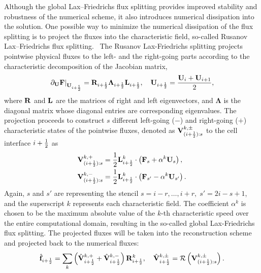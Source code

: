 Although the global Lax–Friedrichs flux splitting provides improved stability and robustness
of the numerical scheme, it also introduces numerical dissipation into the solution.
One possible way to minimize the numerical dissipation of the flux splitting is to project
the fluxes into the characteristic field, so-called Rusanov Lax–Friedrichs flux splitting.~\cite{vcrnjaric2006different,mignone2010high}
The Rusanov Lax-Friedrichs splitting projects pointwise physical fluxes
to the left- and the right-going parts according to the characteristic decomposition of the Jacobian matrix,
\begin{equation}\label{eq:jacobian_iph}
    \left. \partial_{\mathbf{U}} \mathbf{F}\right|_{\mathbf{U}_{{i+\frac{1}{2}}}}=
        \mathbf{R}_{{i+\frac{1}{2}}} \mathbf{\Lambda}_{{i+\frac{1}{2}}} \mathbf{L}_{{i+\frac{1}{2}}}, \quad
        \mathbf{U}_{{i+\frac{1}{2}}} = \frac{\mathbf{U}_{i} + \mathbf{U}_{i+1}}{2},
\end{equation}
where \( \mathbf{R} \) and \( \mathbf{L} \) are the matrices of right and left eigenvectors,
and \( \mathbf{\Lambda} \) is the diagonal matrix whose diagonal entries are corresponding eigenvalues.
The projection proceeds to construct \( s \) different left-going (\( - \)) and right-going (\( + \)) characteristic
states of the pointwise fluxes, denoted as \( \mathbf{V}^{k, \pm}_{(i+\frac{1}{2}):{s}} \)
to the cell interface \( i + \frac{1}{2} \) as
\begin{equation}\label{eq:rus_lf_splitting}
    \begin{split}
        \mathbf{V}^{k,+}_{(i+\frac{1}{2}):{s}}
            &= \frac{1}{2} \mathbf{L}_{i+\frac{1}{2}}^{k} \cdot \left(\mathbf{F}_{s} + \alpha^k \mathbf{U}_{s} \right), \\
        \mathbf{V}^{k,-}_{(i+\frac{1}{2}):{s}}
            &= \frac{1}{2} \mathbf{L}_{i+\frac{1}{2}}^{k} \cdot \left(\mathbf{F}_{s'} - \alpha^k \mathbf{U}_{s'} \right).
    \end{split}
\end{equation}
Again, \( s \) and \( s' \) are representing the stencil
\( s = i-r, \dots, i+r, \; s' = 2i-s+1 \),
and the superscript \( k \) represents each characteristic field.
The coefficient \( \alpha^{k} \) is chosen to be the maximum absolute value of the
\( k \)-th characteristic speed over the entire computational domain,
resulting in the so-called global Lax-Friedrichs flux splitting.
The projected fluxes will be taken into the reconstruction scheme and projected back to the numerical fluxes:
\begin{equation}\label{eq:rus_lf_splitting_combine}
    \hat{\mathbf{f}}_{i+\frac{1}{2}}
        = \sum\limits_{k}\left( \hat{\mathbf{V}}_{i+\frac{1}{2}}^{k,+} + \hat{\mathbf{V}}_{i+\frac{1}{2}}^{k,-}\right) \mathbf{R}^{k}_{i+\frac{1}{2}},
    \quad
    \hat{\mathbf{V}}_{i+\frac{1}{2}}^{k,\pm} =
        \mathcal{R}\left(
            \mathbf{V}^{k,\pm}_{(i+\frac{1}{2}):{s}}
        \right).
\end{equation}


